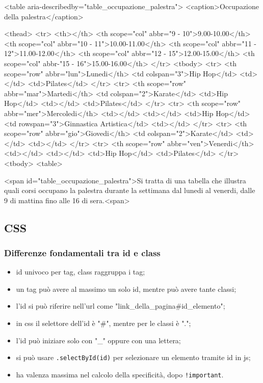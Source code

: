 \documentclass[12pt]{article}
\begin{document}
\begin{htmlcode}
	<table aria-describedby="table_occupazione_palestra">
	<caption>Occupazione della palestra</caption>

	<thead>
	<tr>
	<th></th>
	<th scope="col" abbr="9 - 10">9.00-10.00</th>
	<th scope="col" abbr="10 - 11">10.00-11.00</th>
	<th scope="col" abbr="11 - 12">11.00-12.00</th>
	<th scope="col" abbr="12 - 15">12.00-15.00</th>
	<th scope="col" abbr-"15 - 16">15.00-16.00</th>
	</tr>
	<tbody>
	<tr>
	<th scope="row" abbr="lun">Lunedi</th>
	<td colspan="3">Hip Hop</td>
	<td></td>
	<td>Pilates</td>
	</tr>
	<tr>
	<th scope="row" abbr="mar">Martedi</th>
	<td colspan="2">Karate</td>
	<td>Hip Hop</td>
	<td></td>
	<td>Pilates</td>
	</tr>
	<tr>
	<th scope="row" abbr="mer">Mercoledi</th>
	<td></td>
	<td></td>
	<td>Hip Hop</td>
	<td rowspan="3">Ginnastica Artistica</td>
	<td></td>
	</tr>
	<tr>
	<th scope="row" abbr="gio">Giovedi</th>
	<td colspan="2">Karate</td>
	<td></td>
	<td></td>
	</tr>
	<tr>
	<th scope="row" abbr="ven">Venerdi</th>
	<td></td>
	<td></td>
	<td>Hip Hop</td>
	<td>Pilates</td>
	</tr>
	<tbody>
	<table>

	<span id="table_occupazione_palestra">Si tratta di una tabella che illustra
	quali corsi occupano la palestra durante la settimana dal lunedi al venerdi,
	dalle 9 di mattina fino alle 16 di sera.<span>
\end{htmlcode}

\subsection{CSS}

\subsubsection{Differenze fondamentali tra id e class}
\begin{itemize}
	\item id univoco per tag, class raggruppa i tag;
	\item un tag può avere al massimo un solo id, mentre può avere tante classi;
	\item l'id si può riferire nell'url come "link\_della\_pagina\#id\_elemento";
	\item in css il selettore dell'id è "\#", mentre per le classi è ".";
	\item l'id può iniziare solo con "\_" oppure con una lettera;
	\item si può usare \lstinline{.selectById(id)} per selezionare un elemento
	      tramite id in js;
	\item ha valenza massima nel calcolo della specificità, dopo
	      \lstinline{!important}.
\end{itemize}
\end{document}
